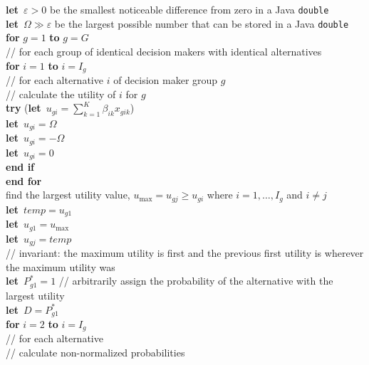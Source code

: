 \documentclass[12pt]{article}
\newcommand{\vc}[1]{\boldsymbol{\mathrm{#1}}}
\newcommand{\e}{\mathrm{e}}
\renewcommand{\algforto}[2]{\textbf{for } #1 \textbf{ to } #2\\\algbegin}
\newcommand{\algendfor}{\algend \textbf{end for}\\}
\newcommand{\algendif}{\algend \textbf{end if}\\}
\newcommand{\alglet}{\mbox{\textbf{let }}}
\newcommand{\algtry}[1]{\textbf{try } #1}
\begin{document}
\begin{algtab}
\alglet $\varepsilon>0$ be the smallest noticeable difference from zero
    in a Java \texttt{double} \\
\alglet $\Omega\gg\varepsilon$ be the largest possible number that can be stored
    in a Java \texttt{double} \\
\algforto{$g=1$}{$g=G$}
	// for each group of identical decision makers with identical alternatives\\
	\algforto{$i=1$}{$i=I_g$}
		// for each alternative $i$ of decision maker group $g$\\
		// calculate the utility of $i$ for $g$\\
		\algtry{(\alglet $u_{gi} = \sum_{k=1}^{K} \beta_{ik}x_{gik}$)}\\
			\alglet $u_{gi} = \Omega$\\
			\alglet $u_{gi} = -\Omega$\\
			\alglet $u_{gi} = 0$\\
		\algendif
	\algendfor
	find the largest utility value, $u_{\max}=u_{gj} \geq u_{gi}$ where
	$i=1,\ldots,I_g$ and $i\neq j$ \\
	\alglet $\mathit{temp} = u_{g1}$ \\
	\alglet $u_{g1} = u_{\max}$ \\
	\alglet $u_{gj} = \mathit{temp}$ \\
	// invariant: the maximum utility is first and
	the previous first utility is wherever the maximum utility was \\
	\alglet $P^*_{g1} = 1$ // arbitrarily assign the probability of the
     		alternative with the largest utility \\
   	\alglet $D = P^*_{g1}$ \\
	\algforto{$i=2$}{$i=I_g$}
		// for each alternative \\
		// calculate non-normalized probabilities \\


\end{algtab}
\end{document}
